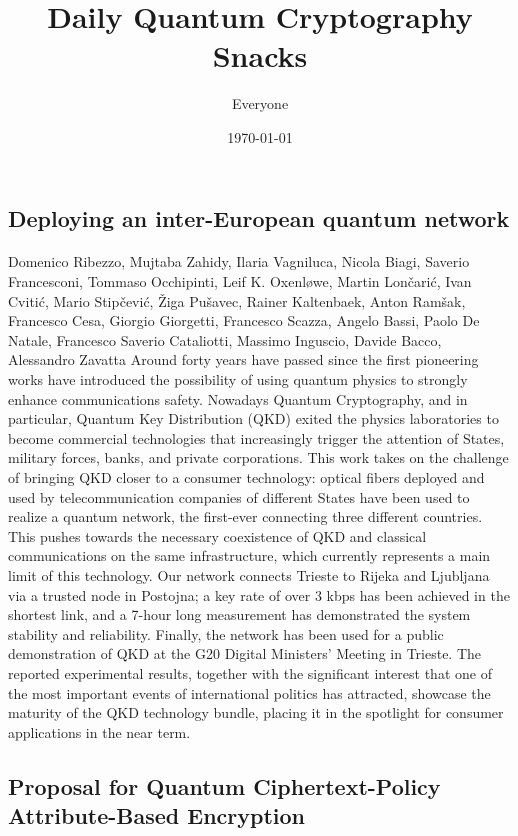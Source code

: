 \documentclass{article}%
\title{Daily Quantum Cryptography Snacks}%
\author{Everyone}%
\date{\today}%
\begin{document}
%
\normalsize%
\maketitle%
\subsection{Deploying an inter-European quantum network}%
\label{subsec:Deployinganinter{-}Europeanquantumnetwork}%
\paragraph{}%
Domenico Ribezzo, Mujtaba Zahidy, Ilaria Vagniluca, Nicola Biagi, Saverio Francesconi, Tommaso Occhipinti, Leif K. Oxenløwe, Martin Lončarić, Ivan Cvitić, Mario Stipčević, Žiga Pušavec, Rainer Kaltenbaek, Anton Ramšak, Francesco Cesa, Giorgio Giorgetti, Francesco Scazza, Angelo Bassi, Paolo De Natale, Francesco Saverio Cataliotti, Massimo Inguscio, Davide Bacco, Alessandro Zavatta%
Around forty years have passed since the first pioneering works have introduced the possibility of using quantum physics to strongly enhance communications safety. Nowadays Quantum Cryptography, and in particular, Quantum Key Distribution (QKD) exited the physics laboratories to become commercial technologies that increasingly trigger the attention of States, military forces, banks, and private corporations. This work takes on the challenge of bringing QKD closer to a consumer technology: optical fibers deployed and used by telecommunication companies of different States have been used to realize a quantum network, the first-ever connecting three different countries. This pushes towards the necessary coexistence of QKD and classical communications on the same infrastructure, which currently represents a main limit of this technology. Our network connects Trieste to Rijeka and Ljubljana via a trusted node in Postojna; a key rate of over 3 kbps has been achieved in the shortest link, and a 7-hour long measurement has demonstrated the system stability and reliability. Finally, the network has been used for a public demonstration of QKD at the G20 Digital Ministers' Meeting in Trieste. The reported experimental results, together with the significant interest that one of the most important events of international politics has attracted, showcase the maturity of the QKD technology bundle, placing it in the spotlight for consumer applications in the near term.

%
\subsection{Proposal for Quantum Ciphertext-Policy Attribute-Based Encryption}%
\label{subsec:ProposalforQuantumCiphertext{-}PolicyAttribute{-}BasedEncryption}%
\end{document}

